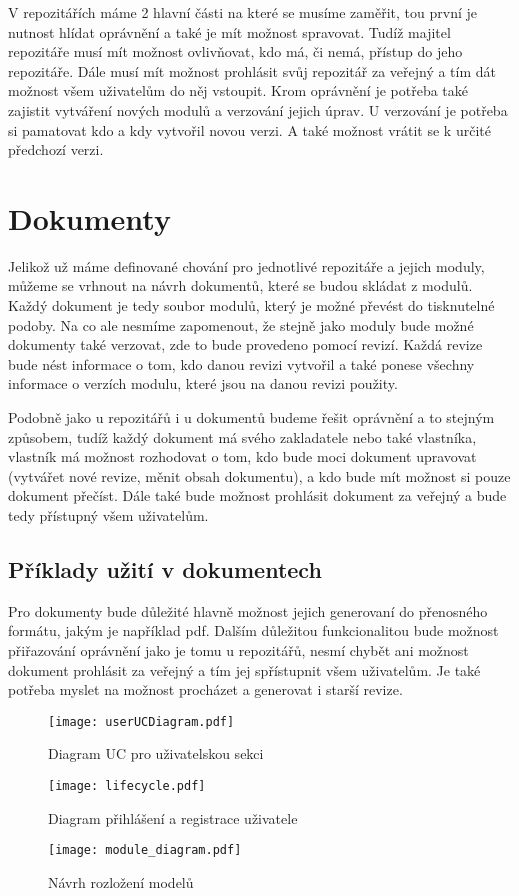 V repozitářích máme 2 hlavní části na které se musíme zaměřit, tou první je nutnost hlídat oprávnění a také je mít možnost spravovat. Tudíž majitel
repozitáře musí mít možnost ovlivňovat, kdo má, či nemá, přístup do jeho repozitáře. Dále musí mít možnost prohlásit svůj repozitář za veřejný a tím
dát možnost všem uživatelům do něj vstoupit. Krom oprávnění je potřeba také zajistit vytváření nových modulů a verzování jejich úprav. U verzování je
potřeba si pamatovat kdo a kdy vytvořil novou verzi. A také možnost vrátit se k určité předchozí verzi.

\section{Dokumenty}

Jelikož už máme definované chování pro jednotlivé repozitáře a jejich moduly, můžeme se vrhnout na návrh dokumentů, které se budou skládat z modulů. Každý
dokument je tedy soubor modulů, který je možné převést do tisknutelné podoby. Na co ale nesmíme zapomenout, že stejně jako moduly bude možné dokumenty také
verzovat, zde to bude provedeno pomocí revizí. Každá revize bude nést informace o tom, kdo danou revizi vytvořil a také ponese všechny informace o verzích
modulu, které jsou na danou revizi použity.

Podobně jako u repozitářů i u dokumentů budeme řešit oprávnění a to stejným způsobem, tudíž každý dokument má svého zakladatele nebo také vlastníka,
vlastník má možnost rozhodovat o tom, kdo bude moci dokument upravovat (vytvářet nové revize, měnit obsah dokumentu), a kdo bude mít možnost si pouze dokument
přečíst. Dále také bude možnost prohlásit dokument za veřejný a bude tedy přístupný všem uživatelům.

\subsection{Příklady užití v dokumentech}

Pro dokumenty bude důležité hlavně možnost jejich generovaní do přenosného formátu, jakým je například \gls{pdf}. Dalším důležitou funkcionalitou bude možnost přiřazování
oprávnění jako je tomu u repozitářů, nesmí chybět ani možnost dokument prohlásit za veřejný a tím jej spřístupnit všem uživatelům. Je také potřeba myslet na možnost
procházet a generovat i starší revize.

\begin{figure}[H]
    \centering
    \texttt{[image: userUCDiagram.pdf]}
    \caption{Diagram UC pro uživatelskou sekci}
    \label{fig:userUCDiagram}
\end{figure}

\begin{figure}[h]
    \centering
    \texttt{[image: lifecycle.pdf]}
    \caption{Diagram přihlášení a registrace uživatele}
    \label{fig:userFlow}
\end{figure}

\begin{figure}[h]
    \centering
    \texttt{[image: module\_diagram.pdf]}
    \caption{Návrh rozložení modelů}
    \label{fig:moduleDia}
\end{figure}